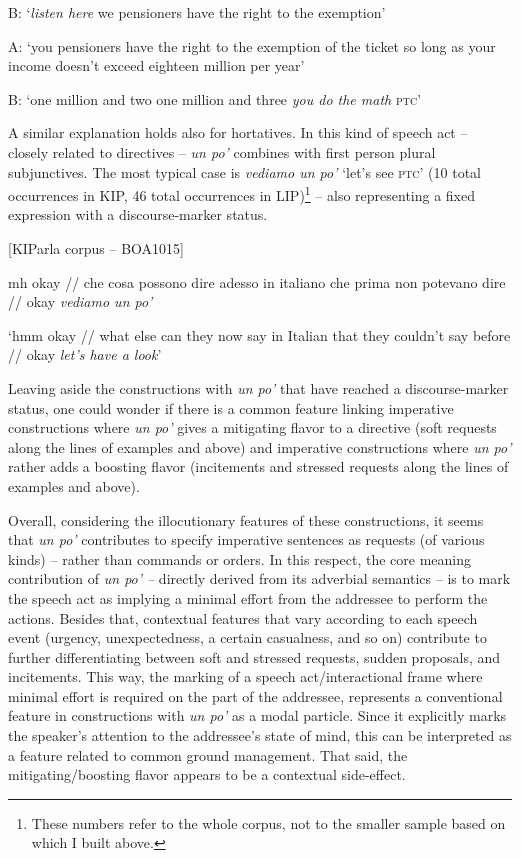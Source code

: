 B:  ‘\textit{listen here} we pensioners have the right to the exemption’

A:  ‘you pensioners have the right to the exemption of the ticket so long as your income doesn’t exceed eighteen million per year’

B:  ‘one million and two one million and three \textit{you do the math} \textsc{ptc}’
    \z %

A similar explanation holds also for hortatives. In this kind of speech act – closely related to directives – \textit{un po’} combines with first person plural subjunctives. The most typical case is \textit{vediamo un po’} ‘let’s see \textsc{ptc}’ (10 total occurrences in KIP, 46 total occurrences in LIP)\footnote{These numbers refer to the whole corpus, not to the smaller sample based on which I built  above.} – also representing a fixed expression with a discourse-marker status.

\ea%
    \label{ex:key:76}

          [KIParla corpus – BOA1015]

mh okay // che cosa possono dire adesso in italiano che prima non potevano dire // okay \textit{vediamo un po’}

\glt ‘hmm okay // what else can they now say in Italian that they couldn’t say before // okay \textit{let’s have a look}’
    \z %

Leaving aside the constructions with \textit{un po’} that have reached a discourse-marker status, one could wonder if there is a common feature linking imperative constructions where \textit{un po’} gives a mitigating flavor to a directive (soft requests along the lines of examples  and  above) and imperative constructions where \textit{un po’} rather adds a boosting flavor (incitements and stressed requests along the lines of examples  and  above).

Overall, considering the illocutionary features of these constructions, it seems that \textit{un po’} contributes to specify imperative sentences as requests (of various kinds) – rather than commands or orders. In this respect, the core meaning contribution of \textit{un po’ –} directly derived from its adverbial semantics – is to mark the speech act as implying a minimal effort from the addressee to perform the actions. Besides that, contextual features that vary according to each speech event (urgency, unexpectedness, a certain casualness, and so on) contribute to further differentiating between soft and stressed requests, sudden proposals, and incitements. This way, the marking of a speech act/interactional frame where minimal effort is required on the part of the addressee, represents a conventional feature in constructions with \textit{un po’} as a modal particle. Since it explicitly marks the speaker’s attention to the addressee’s state of mind, this can be interpreted as a feature related to common ground management. That said, the mitigating/boosting flavor appears to be a contextual side-effect.

